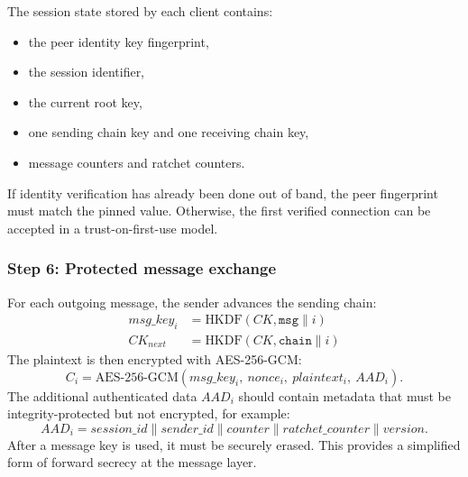 \documentclass{article}
\begin{document}
      The session state stored by each client contains:
      \begin{itemize}
            \item the peer identity key fingerprint,
            \item the session identifier,
            \item the current root key,
            \item one sending chain key and one receiving chain key,
            \item message counters and ratchet counters.
      \end{itemize}

      If identity verification has already been done out of band, the peer
      fingerprint must match the pinned value. Otherwise, the first verified
      connection can be accepted in a trust-on-first-use model.

      \subsubsection{Step 6: Protected message exchange}
      For each outgoing message, the sender advances the sending chain:
      \begin{align*}
            msg\_key_i &= \text{HKDF}(CK,\texttt{msg} \parallel i) \\
            CK_{next}  &= \text{HKDF}(CK,\texttt{chain} \parallel i)
      \end{align*}
      The plaintext is then encrypted with AES-256-GCM:
      \[
            C_i = \text{AES-256-GCM}(msg\_key_i,\ nonce_i,\ plaintext_i,\ AAD_i).
      \]
      The additional authenticated data $AAD_i$ should contain metadata that
      must be integrity-protected but not encrypted, for example:
      \[
            AAD_i = session\_id \parallel sender\_id \parallel counter \parallel ratchet\_counter \parallel version.
      \]
      After a message key is used, it must be securely erased. This provides a
      simplified form of forward secrecy at the message layer.
\end{document}
